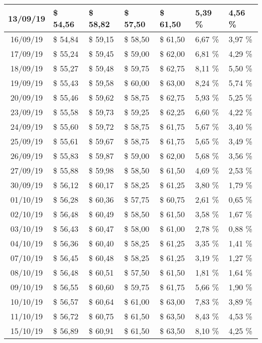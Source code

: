 \begin{center}
\begin{longtable}{|c|p{1.5cm}|p{1.5cm}|p{1.5cm}|p{1.5cm}|p{1.5cm}|p{1.5cm}|}
13/09/19 & \$ 54,56 & \$ 58,82 & \$ 57,50 & \$ 61,50 & 5,39 \% & 4,56 \% \\ \hline
16/09/19 & \$ 54,84 & \$ 59,15 & \$ 58,50 & \$ 61,50 & 6,67 \% & 3,97 \% \\ \hline
17/09/19 & \$ 55,24 & \$ 59,45 & \$ 59,00 & \$ 62,00 & 6,81 \% & 4,29 \% \\ \hline
18/09/19 & \$ 55,27 & \$ 59,48 & \$ 59,75 & \$ 62,75 & 8,11 \% & 5,50 \% \\ \hline
19/09/19 & \$ 55,43 & \$ 59,58 & \$ 60,00 & \$ 63,00 & 8,24 \% & 5,74 \% \\ \hline
20/09/19 & \$ 55,46 & \$ 59,62 & \$ 58,75 & \$ 62,75 & 5,93 \% & 5,25 \% \\ \hline
23/09/19 & \$ 55,58 & \$ 59,73 & \$ 59,25 & \$ 62,25 & 6,60 \% & 4,22 \% \\ \hline
24/09/19 & \$ 55,60 & \$ 59,72 & \$ 58,75 & \$ 61,75 & 5,67 \% & 3,40 \% \\ \hline
25/09/19 & \$ 55,61 & \$ 59,67 & \$ 58,75 & \$ 61,75 & 5,65 \% & 3,49 \% \\ \hline
26/09/19 & \$ 55,83 & \$ 59,87 & \$ 59,00 & \$ 62,00 & 5,68 \% & 3,56 \% \\ \hline
27/09/19 & \$ 55,88 & \$ 59,98 & \$ 58,50 & \$ 61,50 & 4,69 \% & 2,53 \% \\ \hline
30/09/19 & \$ 56,12 & \$ 60,17 & \$ 58,25 & \$ 61,25 & 3,80 \% & 1,79 \% \\ \hline
01/10/19 & \$ 56,28 & \$ 60,36 & \$ 57,75 & \$ 60,75 & 2,61 \% & 0,65 \% \\ \hline
02/10/19 & \$ 56,48 & \$ 60,49 & \$ 58,50 & \$ 61,50 & 3,58 \% & 1,67 \% \\ \hline
03/10/19 & \$ 56,43 & \$ 60,47 & \$ 58,00 & \$ 61,00 & 2,78 \% & 0,88 \% \\ \hline
04/10/19 & \$ 56,36 & \$ 60,40 & \$ 58,25 & \$ 61,25 & 3,35 \% & 1,41 \% \\ \hline
07/10/19 & \$ 56,45 & \$ 60,48 & \$ 58,25 & \$ 61,25 & 3,19 \% & 1,27 \% \\ \hline
08/10/19 & \$ 56,48 & \$ 60,51 & \$ 57,50 & \$ 61,50 & 1,81 \% & 1,64 \% \\ \hline
09/10/19 & \$ 56,55 & \$ 60,60 & \$ 59,75 & \$ 61,75 & 5,66 \% & 1,90 \% \\ \hline
10/10/19 & \$ 56,57 & \$ 60,64 & \$ 61,00 & \$ 63,00 & 7,83 \% & 3,89 \% \\ \hline
11/10/19 & \$ 56,72 & \$ 60,75 & \$ 61,50 & \$ 63,50 & 8,43 \% & 4,53 \% \\ \hline
15/10/19 & \$ 56,89 & \$ 60,91 & \$ 61,50 & \$ 63,50 & 8,10 \% & 4,25 \% \\ \hline

\end{longtable}
\end{center}
